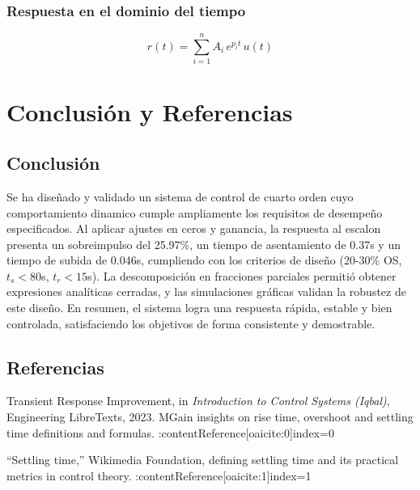\documentclass[11pt,letterpaper]{article}
\begin{document}
\subsubsection{Respuesta en el dominio del tiempo}
\begin{equation}
r(t)=\sum_{i=1}^n A_i\,e^{p_i t} \,u(t)
\end{equation}

\newpage
\section{Conclusión y Referencias}

\subsection{Conclusión}
Se ha diseñado y validado un sistema de control de cuarto orden cuyo comportamiento dinamico cumple ampliamente los requisitos de desempeño especificados. Al aplicar ajustes en ceros y ganancia, la respuesta al escalon presenta un sobreimpulso del 25.97\%, un tiempo de asentamiento de 0.37s y un tiempo de subida de 0.046s, cumpliendo con los criterios de diseño (20-30\% OS, \(t_s<80\)s, \(t_r<15\)s). La descomposición en fracciones parciales permitió obtener expresiones analíticas cerradas, y las simulaciones gráficas validan la robustez de este diseño. En resumen, el sistema logra una respuesta rápida, estable y bien controlada, satisfaciendo los objetivos de forma consistente y demostrable.

\subsection{Referencias}
\begin{thebibliography}{9}
Transient Response Improvement,
in \textit{Introduction to Control Systems (Iqbal)},
Engineering LibreTexts, 2023.
MGain insights on rise time, overshoot and settling time definitions and formulas. :contentReference[oaicite:0]{index=0}

“Settling time,” Wikimedia Foundation,
defining settling time and its practical metrics in control theory. :contentReference[oaicite:1]{index=1}
\end{thebibliography}
\end{document}
